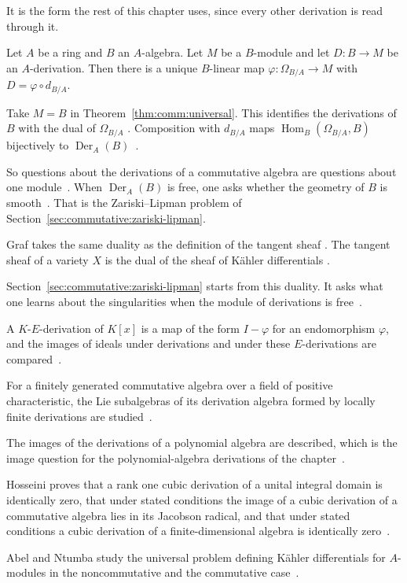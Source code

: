 It is the form the rest of this chapter uses, since every other derivation is
read through it.

\begin{theorem}\label{thm:comm:universal}
Let $A$ be a ring and $B$ an $A$-algebra. Let $M$ be a $B$-module and let
$D\colon B\to M$ be an $A$-derivation. Then there is a unique $B$-linear map
$\varphi\colon \Omega_{B/A} \to M$ with $D = \varphi\circ d_{B/A}$.
\end{theorem}

Take $M = B$ in Theorem~\ref{thm:comm:universal}. This identifies the
derivations of $B$ with the dual of $\Omega_{B/A}$
\cite[p.~92]{Johnson1969Kahler}. Composition with $d_{B/A}$ maps
$\operatorname{Hom}_B(\Omega_{B/A}, B)$ bijectively to
$\operatorname{Der}_A(B)$~\cite[p.~92]{Johnson1969Kahler}.

So questions about the derivations of a commutative algebra are questions
about one module~\cite[p.~92]{Johnson1969Kahler}. When
$\operatorname{Der}_A(B)$ is free, one asks whether the geometry of $B$ is
smooth~\cite[p.~270]{BiswasGurjarKolte2014}. That is the Zariski--Lipman
problem of Section~\ref{sec:commutative:zariski-lipman}.

Graf takes the same duality as the definition of the tangent sheaf
\cite[p.~115]{Graf2022LZPosChar}. The tangent sheaf of a variety $X$ is the
dual of the sheaf of Kähler differentials
\cite[p.~115]{Graf2022LZPosChar}.

Section~\ref{sec:commutative:zariski-lipman} starts from this duality. It asks
what one learns about the singularities when the module of derivations is
free~\cite[p.~270]{BiswasGurjarKolte2014}.

A $K$-$E$-derivation of $K[x]$ is a map of the form $I-\varphi$ for an endomorphism $\varphi$, and the images of ideals under derivations and under these $E$-derivations are compared~\cite{WlImagesOfIdeals2008}.

For a finitely generated commutative algebra over a field of positive characteristic, the Lie subalgebras of its derivation algebra formed by locally finite derivations are studied~\cite{WlLieAlgebrasOfLocallyFiniteDeri2019}.

The images of the derivations of a polynomial algebra are described, which is the image question for the polynomial-algebra derivations of the chapter~\cite{WlImagesOfDerivationsOfPolynomia2017}.

Hosseini proves that a rank one cubic derivation of a unital integral domain is identically zero, that under stated conditions the image of a cubic derivation of a commutative algebra lies in its Jacobson radical, and that under stated conditions a cubic derivation of a finite-dimensional algebra is identically zero~\cite{WlWhatCanBeExpectedFromACubicDer2017}.

Abel and Ntumba study the universal problem defining K\"ahler differentials for $A$-modules in the noncommutative and the commutative case~\cite{WlUniversalProblemForKaehlerDiff2014}.

